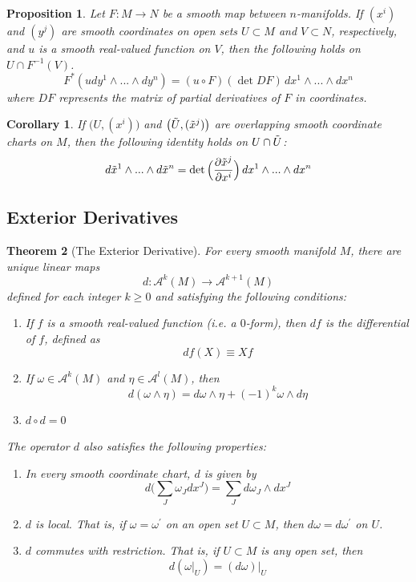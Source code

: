 \documentclass{article}
\newtheorem{theorem}{Theorem}[section]
\newtheorem{proposition}[theorem]{Proposition}
\newtheorem{corollary}{Corollary}[theorem]
\theoremstyle{remark}
\theoremstyle{definition}
\begin{document}
    \begin{proposition}
    Let $F: M \longrightarrow N$ be a smooth map between $n$-manifolds. If $(x^i)$ and $(y^j)$ are smooth coordinates on open sets $U \subset M$ and $V \subset N$, respectively, and $u$ is a smooth real-valued function on $V$, then the following holds on $U \cap F^{-1} (V)$. 
    \[F^* (u dy^1 \wedge ... \wedge dy^n) = (u \circ F) (\det{DF})\, dx^1 \wedge ... \wedge dx^n\]
    where $DF$ represents the matrix of partial derivatives of $F$ in coordinates. 
    \end{proposition}

    \begin{corollary}
    If $\big(U, (x^i)\big)$ and $\big(\Tilde{U}, (\Tilde{x}^j)\big)$ are overlapping smooth coordinate charts on $M$, then the following identity holds on $U \cap \Tilde{U}$:
    \[d\Tilde{x}^1 \wedge ... \wedge d\Tilde{x}^n = \det \Big( \frac{\partial \Tilde{x}^j}{\partial x^i}\Big)\, dx^1 \wedge ... \wedge dx^n\]
    \end{corollary}

  \subsection{Exterior Derivatives}

    \begin{theorem}[The Exterior Derivative]
    For every smooth manifold $M$, there are unique linear maps
    \[d: \mathcal{A}^k (M) \longrightarrow \mathcal{A}^{k+1} (M)\]
    defined for each integer $k \geq 0$ and satisfying the following conditions: 
    \begin{enumerate}
        \item If $f$ is a smooth real-valued function (i.e. a $0$-form), then $df$ is the differential of $f$, defined as 
        \[df(X) \equiv X f\]
        \item If $\omega \in \mathcal{A}^k (M)$ and $\eta \in \mathcal{A}^l (M)$, then 
        \[d (\omega \wedge \eta) = d \omega \wedge \eta + (-1)^k \omega \wedge d\eta\]
        \item $d \circ d = 0$
    \end{enumerate}
    The operator $d$ also satisfies the following properties: 
    \begin{enumerate}
        \item In every smooth coordinate chart, $d$ is given by 
        \[d \bigg( \sum_J \omega_J dx^J \bigg) = \sum_J d\omega_J \wedge d x^J\]
        \item $d$ is local. That is, if $\omega = \omega^\prime$ on an open set $U \subset M$, then $d\omega = d\omega^\prime$ on $U$. 
        \item $d$ commutes with restriction. That is, if $U \subset M$ is any open set, then 
        \[d (\omega|_U) = (d \omega) \big|_U\]
    \end{enumerate}
    \end{theorem}
\end{document}
